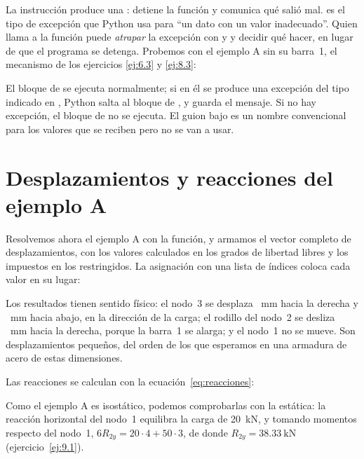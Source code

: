 La instrucción  produce una : detiene
la función y comunica qué salió mal.  es el tipo de excepción
que Python usa para \enquote{un dato con un valor inadecuado}. Quien llama a
la función puede \emph{atrapar} la excepción con  y  y
decidir qué hacer, en lugar de que el programa se detenga. Probemos con el
ejemplo A sin su barra~1, el mecanismo de los ejercicios
\ref{ej:6.3} y \ref{ej:8.3}:

\begin{python}
El bloque de  se ejecuta normalmente; si en él se produce una
excepción del tipo indicado en , Python salta al bloque de
, y  guarda el mensaje. Si no hay excepción, el bloque
de  no se ejecuta. El guion bajo \py{_} es un nombre convencional
para los valores que se reciben pero no se van a usar.
\end{python}

\section{Desplazamientos y reacciones del ejemplo A}\label{sec:resultados_a}

Resolvemos ahora el ejemplo A con la función, y armamos el vector completo de
desplazamientos, con los valores calculados en los grados de libertad libres
y los impuestos en los restringidos. La asignación con una lista de índices
coloca cada valor en su lugar:

Los resultados tienen sentido físico: el nodo~3 se desplaza
~\si{\milli\metre} hacia la derecha y
~\si{\milli\metre} hacia abajo, en la dirección de la
carga; el rodillo del nodo~2 se desliza ~\si{\milli\metre}
hacia la derecha, porque la barra~1 se alarga; y el
nodo~1 no se mueve. Son desplazamientos pequeños, del orden de los que
esperamos en una armadura de acero de estas dimensiones.

Las reacciones se calculan con la ecuación~\eqref{eq:reacciones}:

Como el ejemplo A es isostático, podemos comprobarlas con la estática: la
reacción horizontal del nodo~1 equilibra la carga de \SI{20}{\kilo\newton}, y
tomando momentos respecto del nodo~1, $6 R_{2y} = 20 \cdot 4 + 50 \cdot 3$, de
donde $R_{2y} = \SI{38.33}{\kilo\newton}$ (ejercicio~\ref{ej:9.1}).

